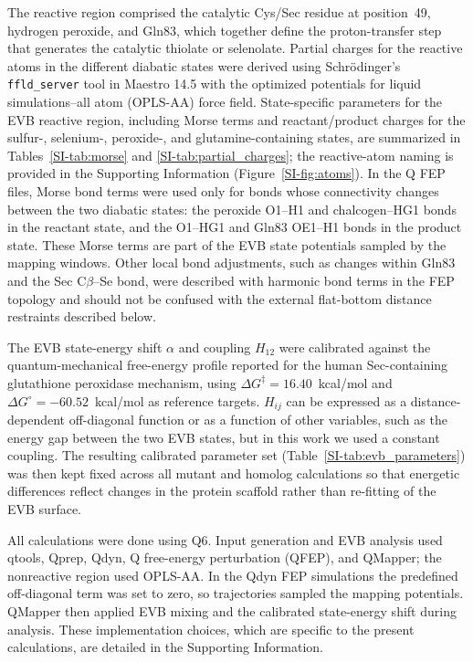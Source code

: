 The reactive region comprised the catalytic Cys/Sec residue at position~49, hydrogen peroxide, and Gln83, which together define the proton-transfer step that generates the catalytic thiolate or selenolate. Partial charges for the reactive atoms in the different diabatic states were derived using Schrödinger's \texttt{ffld\_server} tool in Maestro 14.5 with the optimized potentials for liquid simulations--all atom (OPLS-AA) force field.\cite{Schrodinger2024Maestro} State-specific parameters for the EVB reactive region, including Morse terms and reactant/product charges for the sulfur-, selenium-, peroxide-, and glutamine-containing states, are summarized in Tables~\ref{SI-tab:morse} and \ref{SI-tab:partial_charges}; the reactive-atom naming is provided in the Supporting Information (Figure~\ref{SI-fig:atoms}). In the Q FEP files, Morse bond terms were used only for bonds whose connectivity changes between the two diabatic states: the peroxide O1--H1 and chalcogen--HG1 bonds in the reactant state, and the O1--HG1 and Gln83 OE1--H1 bonds in the product state. These Morse terms are part of the EVB state potentials sampled by the mapping windows. Other local bond adjustments, such as changes within Gln83 and the Sec C$\beta$--Se bond, were described with harmonic bond terms in the FEP topology and should not be confused with the external flat-bottom distance restraints described below.

The EVB state-energy shift $\alpha$ and coupling $H_{12}$ were calibrated against the quantum-mechanical free-energy profile reported for the human Sec-containing glutathione peroxidase mechanism,\cite{prabhakar_is_2006} using $\Delta G^{\ddagger}=16.40$~kcal/mol and $\Delta G^{\circ}=-60.52$~kcal/mol as reference targets. $H_{ij}$ can be expressed as a distance-dependent off-diagonal function or as a function of other variables, such as the energy gap between the two EVB states, but in this work we used a constant coupling. The resulting calibrated parameter set (Table~\ref{SI-tab:evb_parameters}) was then kept fixed across all mutant and homolog calculations so that energetic differences reflect changes in the protein scaffold rather than re-fitting of the EVB surface.

All calculations were done using Q6.\cite{marelius_q_1999} Input generation and EVB analysis used qtools, Qprep, Qdyn, Q free-energy perturbation (QFEP), and QMapper; the nonreactive region used OPLS-AA.\cite{PurgBauer2017Qtools,jorgensen1996opls_aa} In the Qdyn FEP simulations the predefined off-diagonal term was set to zero, so trajectories sampled the mapping potentials. QMapper then applied EVB mixing and the calibrated state-energy shift during analysis. These implementation choices, which are specific to the present calculations, are detailed in the Supporting Information.

